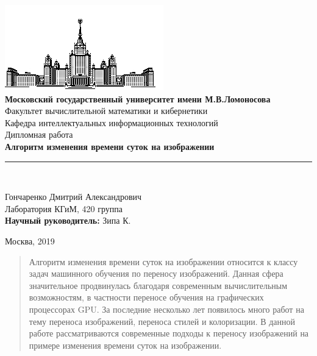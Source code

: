 \documentclass[11pt,a4paper]{extarticle}
\begin{document}
\begin{titlepage}
	\begin{centering}
		\includegraphics{img/msu}\\
		\large{
			\textbf{Московский государственный университет имени М.В.Ломоносова}\\
			Факультет вычислительной математики и кибернетики\\
			Кафедра интеллектуальных информационных технологий\\[4cm]
		}
		\Large{
			Дипломная работа\\[0.5cm]
		}
		\Large{
			\textbf{Алгоритм изменения времени суток на изображении}\\
		}
		\rule[0.3cm]{14cm}{0.02cm}\\[3cm]
	\end{centering}
	\begin{flushright}
		\large{
			Гончаренко Дмитрий Александрович\\
			Лаборатория КГиМ, 420 группа \\

			\textbf{Научный руководитель:} Зипа К.\\
		}
	\end{flushright}
	\begin{center}
		\vfill
		\large{
			Москва, 2019
		}
	\end{center}
\end{titlepage}

\begin{abstract}
	Алгоритм изменения времени суток на изображении относится к классу задач машинного обучения по переносу изображений.
	Данная сфера значительное продвинулась благодаря современным вычислительным возможностям, в частности переносе обучения на графических процессорах GPU.
	За последние несколько лет появилось много работ на тему переноса изображений, переноса стилей и колоризации.
	В данной работе рассматриваются современные подходы к переносу изображений на примере изменения времени суток на изображении.
\end{abstract}
\end{document}
